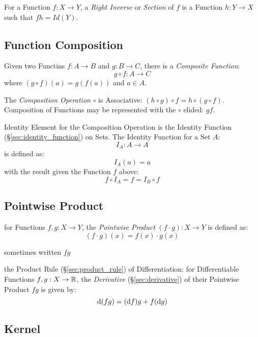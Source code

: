 For a Function $f: X \rightarrow Y$, a \emph{Right Inverse} or
\emph{Section} of $f$ is a Function $h: Y \rightarrow X$ such that $fh
= Id(Y)$.



\subsection{Function Composition}\label{sec:function_composition}

Given two Functins $f : A \rightarrow B$ and $g : B \rightarrow C$,
there is a \emph{Composite Function}:
\[
  g \circ f : A \rightarrow C
\]
where $(g \circ f)(a) = g(f(a))$ and $a \in A$.

The \emph{Composition Operation} $\circ$ is Associative: $(h \circ g)
\circ f = h \circ (g \circ f)$. Composition of Functions may be
represented with the $\circ$ elided: $gf$.

Identity Element for the Composition Operation is the Identity
Function (\S\ref{sec:identity_function}) on Sets. The Identity
Function for a Set $A$:
\[
  I_A : A \rightarrow A
\]
is defined as:
\[
  I_A(a) = a
\]
with the result given the Function $f$ above:
\[
  f \circ I_A = f = I_B \circ f
\]



\subsection{Pointwise Product}\label{sec:pointwise_product}

for Functions $f, g : X \rightarrow Y$, the \emph{Pointwise Product}
$(f\cdot{g}) : X \rightarrow Y$ is defined as:
\[
  (f \cdot g)(x) = f(x) \cdot g(x)
\]

sometimes written $fg$

the Product Rule (\S\ref{sec:product_rule}) of Differentiation: for
Differentiable Functions $f, g : X \rightarrow \mathbb{R}$, the \emph{Derivative}
(\S\ref{sec:derivative}) of their Pointwise Product $fg$ is given by:
\[
  \mathrm{d}(fg) = (\mathrm{d}f)g + f(\mathrm{d}g)
\]



\subsection{Kernel}\label{sec:function_kernel}

